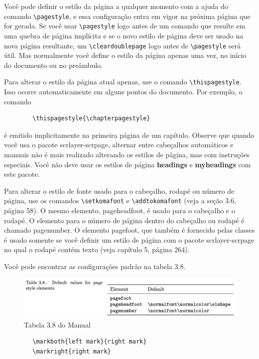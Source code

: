 Você pode definir o estilo da página a qualquer momento com a ajuda do comando \verb|\pagestyle|, e essa configuração entra em vigor na próxima página que for gerada. Se você usar \verb|\pagestyle| logo antes de um comando que resulte em uma quebra de página implícita e se o novo estilo de página deve ser usado na nova página resultante, um \verb|\cleardoublepage| logo antes de \verb|\pagestyle| será útil. Mas normalmente você define o estilo da página apenas uma vez, no início do documento ou no preâmbulo.

Para alterar o estilo da página atual apenas, use o comando \verb|\thispagestyle|. Isso ocorre automaticamente em alguns pontos do documento. Por exemplo, o comando
\begin{verbatim}
        \thispagestyle{\chapterpagestyle}   
\end{verbatim}

é emitido implicitamente na primeira página de um capítulo.
Observe que quando você usa o pacote scrlayer-scrpage, alternar entre cabeçalhos automáticos e manuais não é mais realizado alterando os estilos de página, mas com instruções especiais. Você não deve usar os estilos de página \textbf{headings} e \textbf{myheadings} com este pacote.

Para alterar o estilo de fonte usado para o cabeçalho, rodapé ou número de página, use os comandos \verb|\setkomafont| e \verb|\addtokomafont| (veja a seção 3.6, página 58). O mesmo elemento, pageheadfoot, é usado para o cabeçalho e o rodapé. O elemento para o número de página dentro do cabeçalho ou rodapé é chamado pagenumber. O elemento pagefoot, que também é fornecido pelas classes \KOMAScript é usado somente se você definir um estilo de página com o pacote scrlayer-scrpage no qual o rodapé contém texto (veja capítulo 5, página 264).

Você pode encontrar as configurações padrão na tabela 3.8.

\begin{figure}[h]
    \centering
    \includegraphics[width=0.8\linewidth]{imagens/tab3_8.png}
    \caption{Tabela 3.8 do Manual}
    \label{fig:tab3_8}
\end{figure}

\begin{verbatim}
        \markboth{left mark}{right mark}
        \markright{right mark}
\end{verbatim}

